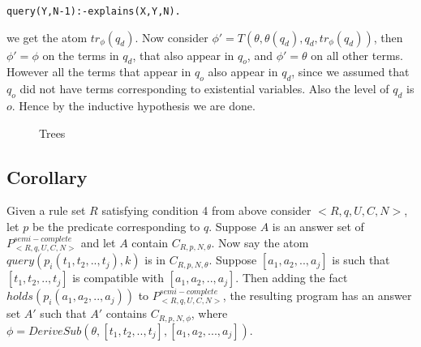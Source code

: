 \documentclass{article}
\begin{document}
\begin{verbatim}
query(Y,N-1):-explains(X,Y,N).    
\end{verbatim}
we get the atom $tr_{\phi}(q_{d})$. Now consider $\phi'= T(\theta, \theta(q_{d}), q_{d}, tr_{\phi}(q_{d}))$, then $\phi'=\phi$ on the terms in $q_{d}$, that also appear in $q_{o}$, and $\phi' = \theta$ on all other terms. However all the terms that appear in $q_{o}$ also appear in $q_{d}$, since we assumed that $q_{o}$ did not have terms corresponding to existential variables. Also the level of $q_{d}$ is $o$. Hence by the inductive hypothesis we are done.

\begin{figure}

    \begin{center}
\end{center}

\caption{Trees}
\end{figure}


 
\subsection{Corollary}
Given a rule set $R$ satisfying condition 4 from above consider $<R,q,U,C,N>$, let $p$ be the predicate corresponding to $q$. Suppose $A$ is an answer set of $P^{semi-complete}_{<R,q,U,C,N>}$ and let $A$ contain $C_{R,p,N,\theta}$. Now say the atom $query(p_{i}(t_{1},t_{2},..,t_{j}),k)$ is in $C_{R,p,N,\theta}$. Suppose $[a_{1},a_{2},..,a_{j}]$ is such that $[t_{1},t_{2},..,t_{j}]$ is compatible with $[a_{1},a_{2},..,a_{j}]$. Then adding the fact $holds(p_{i}(a_{1},a_{2},..,a_{j}))$ to $P^{semi-complete}_{<R,q,U,C,N>}$, the resulting program has an answer set $A'$ such that $A'$ contains $C_{R,p,N,\phi}$, where $\phi = DeriveSub(\theta, [t_{1},t_{2},..,t_{j}],[a_{1},a_{2},...,a_{j}])$. 
\end{document}

